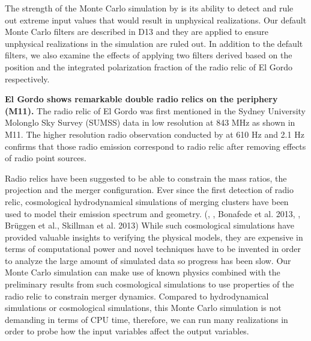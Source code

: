 The strength of the Monte Carlo simulation by  is its ability
to detect and rule out extreme input values that would result in
unphysical realizations. 
Our default Monte Carlo filters are described in D13 and they are applied to ensure 
unphysical realizations in the simulation are ruled out. 
In addition to the default filters, we also examine the effects of applying 
two filters derived based on the position and the integrated polarization
fraction of the radio relic of El Gordo respectively. 

\textbf{El Gordo shows remarkable double radio relics on the periphery
(M11).} The radio relic  of El Gordo was first mentioned in the Sydney University
Molonglo Sky Survey (SUMSS) data in low resolution at 843 MHz
\citep{Mauch03} as shown in
M11. The higher resolution radio observation conducted by \cite{L13} at 610
\mega Hz and 2.1 \giga Hz confirms that those radio emission correspond to
radio relic after removing effects of radio point sources.

Radio relics have been suggested to be able to constrain the
mass ratios, the projection and the merger configuration.
\citep{vanWeeren10} 
Ever since the first detection of radio relic, cosmological hydrodynamical simulations of
merging clusters have been used to model their emission spectrum and
geometry. (\citealt{Vazza11}, \citealt{VanWeerenRJ2011}, Bonafede
et al. 2013, \citealt{E98}, Br\"{u}ggen et al., Skillman et al.
2013) While such cosmological simulations have provided valuable insights
to verifying the physical models, they are expensive in terms of
computational power and novel techniques have to be invented in order to
analyze the large amount of simulated data so progress has been slow. 
Our Monte Carlo simulation can make use of known physics combined with the
preliminary results from such cosmological simulations to use properties of
the radio relic to constrain merger dynamics. 
Compared to hydrodynamical simulations or cosmological simulations, this
    Monte Carlo simulation is not demanding in terms of CPU time, therefore, we
    can run many realizations in order to probe how the input variables
affect the output variables. 

